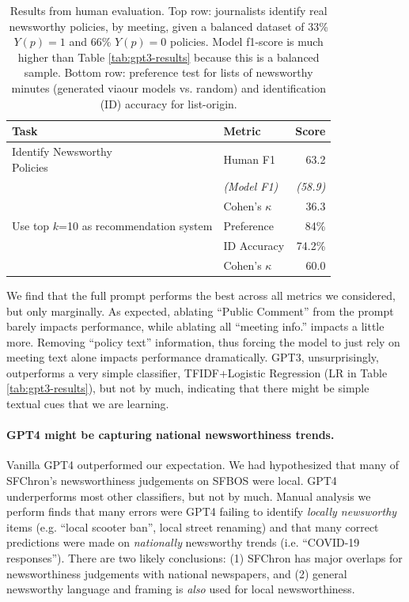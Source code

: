 \documentclass[11pt]{article}
\begin{document}
\begin{table}
    \centering
    \begin{tabularx}{\linewidth}{Xlr}
    \toprule
    Task & Metric & Score \\ 
    \midrule
    \multirowcell{2}[0pt][l]{Identify Newsworthy\\ \quad Policies} & Human F1 & 63.2 \\
    & \textit{(Model F1)} & \textit{(58.9)} \\
    & Cohen's $\kappa$ & 36.3\\ 
    \midrule
    \multirowcell{3}[0pt][l]{Use top $k$=10 \\ \quad as recommendation\\ \quad system} & Preference & 84\% \\ 
    & ID Accuracy & 74.2\% \\ 
    & Cohen's $\kappa$ & 60.0\\ 
    \bottomrule
    \end{tabularx}
    \caption{Results from human evaluation. Top row: journalists identify real newsworthy policies, by meeting, given a balanced dataset of 33\% $Y(p)=1$ and 66\% $Y(p)=0$ policies. Model f1-score is much higher than Table \ref{tab:gpt3-results} because this is a balanced sample. Bottom row: preference test for lists of newsworthy minutes (generated viaour models vs. random) and identification (ID) accuracy for list-origin.}
    \label{tbl:human-eval}
\end{table}

We find that the full prompt performs the best across all metrics we considered, but only marginally. As expected, ablating ``Public Comment'' from the prompt barely impacts performance, while ablating all ``meeting info.'' impacts a little more. Removing ``policy text'' information, thus forcing the model to just rely on meeting text alone impacts performance dramatically. GPT3, unsurprisingly, outperforms a very simple classifier, TFIDF+Logistic Regression (LR in Table \ref{tab:gpt3-results}), but not by much, indicating that there might be simple textual cues that we are learning. 

\paragraph{GPT4 might be capturing national newsworthiness trends.} Vanilla GPT4 outperformed our expectation. We had hypothesized that many of SFChron's newsworthiness judgements on SFBOS were local. GPT4 underperforms most other classifiers, but not by much. Manual analysis we perform finds that many errors were GPT4 failing to identify \textit{locally newsworthy} items (e.g. ``local scooter ban'', local street renaming) and that many correct predictions were made on \textit{nationally} newsworthy trends (i.e. ``COVID-19 responses''). There are two likely conclusions: (1) SFChron has major overlaps for newsworthiness judgements with national newspapers, and (2) general newsworthy language and framing is \textit{also} used for local newsworthiness.
\end{document}
